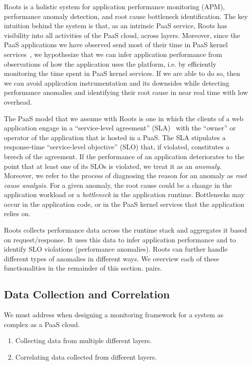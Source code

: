 Roots is a holistic system for application performance monitoring (APM), 
performance anomaly detection, and root cause bottleneck identification.
The key intuition behind the system is that, as an intrinsic PaaS service, Roots
has visibility into all activities of the PaaS cloud, across layers.
Moreover, since the PaaS applications we have observed send most of their time in 
PaaS kernel services~\cite{Jayathilaka:2015:RTS:2806777.2806842}, we hypothesize
that we can infer application performance from observations of how
 the application uses the platform, i.e. by efficiently monitoring the time spent in 
PaaS kernel services. If we are able to do so, then we can avoid application
instrumentation and its downsides while detecting performance anomalies and 
identifying their root cause in near real time with low overhead.

The PaaS model that we assume with Roots is one 
in which the clients of a web application engage in a
``service-level agreement'' (SLA)~\cite{Keller:2003:WFS:635430.635442}
with the ``owner'' or operator of the application that is hosted in a PaaS.  The SLA
stipulates a response-time ``service-level objective'' (SLO) that, if violated, 
constitutes a breech of the agreement.
If the performance of an application deteriorates to the
point that at least one of its SLOs is violated, we treat it 
as an \textit{anomaly}. Moreover, we refer to the process
of diagnosing the reason for 
an anomaly as \textit{root cause analysis}.
For a given anomaly, the root cause could be a change in the application workload or
a \textit{bottleneck} in the application runtime. Bottlenecks may occur in the 
application code, or in the PaaS kernel services that the application relies on.

Roots collects performance data across the runtime stack and aggregates it based on 
request/response.  It uses this data to infer application performance and to identify
SLO violations (performance anomalies).  Roots can further handle different types of anomalies
in different ways.  We overview each of these functionalities in the remainder of this section.
pairs.

\subsection{Data Collection and Correlation}

We must address when designing a monitoring framework for
a system as complex as a PaaS cloud.
\begin{enumerate}
\item Collecting data from multiple different layers.
\item Correlating data collected from different layers.
\end{enumerate}

